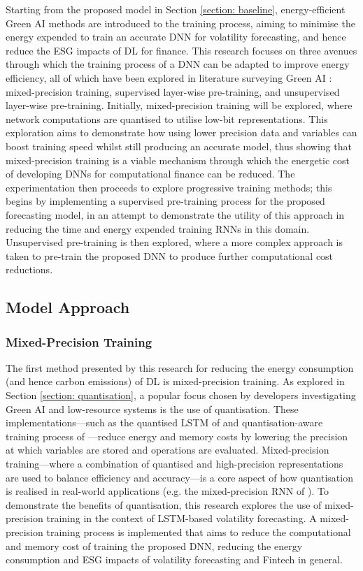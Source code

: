 \documentclass[a4paper, 11pt]{report}
\begin{document}
    Starting from the proposed model in Section \ref{section: baseline}, energy-efficient Green AI methods are introduced to the training process, aiming to minimise the energy expended to train an accurate DNN for volatility forecasting, and hence reduce the ESG impacts of DL for finance. This research focuses on three avenues through which the training process of a DNN can be adapted to improve energy efficiency, all of which have been explored in literature surveying Green AI \citep{xu-2021}: mixed-precision training, supervised layer-wise pre-training, and unsupervised layer-wise pre-training. Initially, mixed-precision training will be explored, where network computations are quantised to utilise low-bit representations. This exploration aims to demonstrate how using lower precision data and variables can boost training speed whilst still producing an accurate model, thus showing that mixed-precision training is a viable mechanism through which the energetic cost of developing DNNs for computational finance can be reduced. The experimentation then proceeds to explore progressive training methods; this begins by implementing a supervised pre-training process for the proposed forecasting model, in an attempt to demonstrate the utility of this approach in reducing the time and energy expended training RNNs in this domain. Unsupervised pre-training is then explored, where a more complex approach is taken to pre-train the proposed DNN to produce further computational cost reductions.


    \subsection{Model Approach}

    \subsubsection{Mixed-Precision Training}

    The first method presented by this research for reducing the energy consumption (and hence carbon emissions) of DL is mixed-precision training. As explored in Section \ref{section: quantisation}, a popular focus chosen by developers investigating Green AI and low-resource systems is the use of quantisation. These implementations---such as the quantised LSTM of \citet{he-2016} and quantisation-aware training process of \citet{fan-2020b}---reduce energy and memory costs by lowering the precision at which variables are stored and operations are evaluated. Mixed-precision training---where a combination of quantised and high-precision representations are used to balance efficiency and accuracy---is a core aspect of how quantisation is realised in real-world applications (e.g. the mixed-precision RNN of \citet{ott-2017}). To demonstrate the benefits of quantisation, this research explores the use of mixed-precision training in the context of LSTM-based volatility forecasting. A mixed-precision training process is implemented that aims to reduce the computational and memory cost of training the proposed DNN, reducing the energy consumption and ESG impacts of volatility forecasting and Fintech in general.
\end{document}
